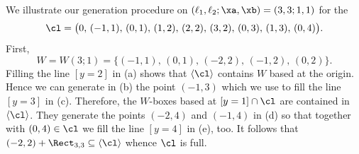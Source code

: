 \begin{exam}
\label{exam:Exam33}
We illustrate our generation procedure on 
$(\ell_1,\ell_2;\xa,\xb)=(3,3;1,1)$ for the {\mes} 
$$
\cl=\big(0,\,(-1,1),\,(0,1),\,(1,2),\,(2,2),\,
(3,2),\,(0,3),\,(1,3),\,(0,4)\big).
$$
First, 
$$
W=W(3;1)=\{(-1,1),\,(0,1),\,(-2,2),\,(-1,2),\,(0,2)\}.
$$
Filling the line $[y=2]$ in (a) shows that $\langle\cl\rangle$ 
contains $W$ based at the origin. Hence we can 
generate in (b) the point $(-1,3)$ which we use to 
fill the line $[y=3]$ in (c). Therefore, the 
$W$-boxes based at $[y=1]\cap\cl$ are contained 
in $\langle\cl\rangle$. They generate the points 
$(-2,4)$ and $(-1,4)$ in (d) so that together with 
$(0,4)\in\cl$ we fill the line $[y=4]$ in (e), too. 
It follows that $(-2,2)+\Rect_{3,3}
\subseteq\langle\cl\rangle$ whence $\cl$ is full.


\end{exam}

